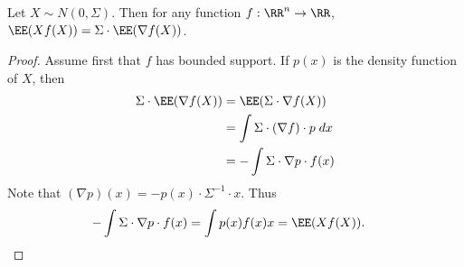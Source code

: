 \begin{lemma}
    Let $X \sim N(0,\Sigma)$. Then for any function $f: \RR^n \to \RR$, $\EE(Xf(X)) = \Sigma \cdot \EE(\nabla f(X))$.
\end{lemma}
\begin{proof}
    Assume first that $f$ has bounded support. If $p(x)$ is the density function of $X$, then
    \begin{align*}
        \Sigma \cdot \EE(\nabla f(X)) &= \EE(\Sigma \cdot \nabla f(X))\\
        &= \int \Sigma \cdot (\nabla f) \cdot p\; dx\\
        &= - \int \Sigma \cdot \nabla p \cdot f(x)
    \end{align*}
    Note that $(\nabla p)(x) = -p(x) \cdot \Sigma^{-1} \cdot x$. Thus
    \begin{align*}
        - \int \Sigma \cdot \nabla p \cdot f(x) &= \int p(x) f(x) x = \EE(Xf(X)). \qedhere
    \end{align*}
\end{proof}

